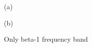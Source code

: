 \begin{figure}[h!]
\begin{minipage}[h]{0.49\linewidth}
 (a) \\
\end{minipage}
\hfill
\begin{minipage}[h]{0.5\linewidth}
 (b) \\
\end{minipage}
\caption{Only beta-1 frequency band} 
\end{figure}


